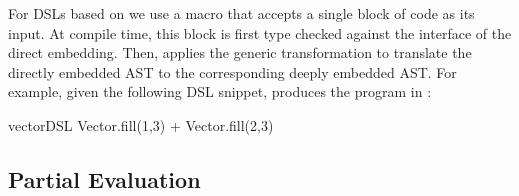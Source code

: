 For DSLs based on \yy we use a macro that accepts a single block of
code as its input. At compile time, this block is first type checked
against the interface of the direct embedding. Then, \yy applies the
generic transformation to translate the directly embedded AST to the
corresponding deeply embedded AST.  For example, given the following
DSL snippet, \yy produces the  program in
:\vspace{3pt}
\begin{listingtiny}
  vectorDSL {
    Vector.fill(1,3) + Vector.fill(2,3)
  }
\end{listingtiny}
\subsection{Partial Evaluation}
\label{sec:partial-evaluation}
